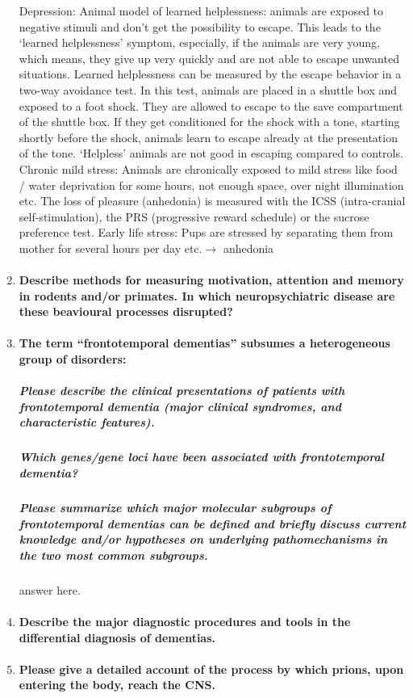 \documentclass[12pt,article,oneside,a4paper]{memoir}
\begin{document}
\begin{enumerate}
Depression:
Animal model of learned helplessness: animals are exposed to negative stimuli and don’t get the possibility to escape. This  leads to the ‘learned helplessness’ symptom, especially, if the animals are very young, which means, they give up very quickly and are not able to escape unwanted situations. Learned helplessness can be measured by the escape behavior in a two-way avoidance test. In this test, animals are placed in a shuttle box and exposed to a foot shock. They are allowed to escape to the save compartment of the shuttle box. If they get conditioned for the shock with a tone, starting shortly before the shock, animals learn to escape already at the presentation of the tone. ‘Helpless’ animals are not good in escaping compared to controls. 
Chronic mild stress: Animals are chronically exposed to mild stress like food / water deprivation for some hours, not enough space, over night illumination etc. The loss of pleasure (anhedonia) is measured with the ICSS (intra-cranial self-stimulation), the PRS (progressive reward schedule) or the sucrose preference test. 
Early life stress: Pups are stressed by separating them from mother for several hours per day etc.$\rightarrow$ anhedonia

\item \paragraph{Describe methods for measuring motivation, attention and memory in rodents and/or primates. In which neuropsychiatric disease are these beavioural processes disrupted?}

\item \paragraph{The term ``frontotemporal dementias'' subsumes a heterogeneous group of disorders:}
\subparagraph{Please describe the clinical presentations of patients with frontotemporal dementia (major clinical syndromes, and characteristic features).}
\subparagraph{Which genes/gene loci have been associated with frontotemporal dementia?}
\subparagraph{Please summarize which major molecular subgroups of frontotemporal dementias can be defined and briefly discuss current knowledge and/or hypotheses on underlying pathomechanisms in the two most common subgroups.} answer here.

\item \paragraph{Describe the major diagnostic procedures and tools in the differential diagnosis of dementias.}

\item \paragraph{Please give a detailed account of the process by which prions, upon entering the body, reach the CNS.}

\end{enumerate}
\end{document}
